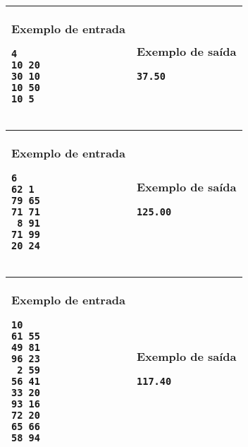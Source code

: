 \newpage
\begin{table}[!h]
\centering
\begin{tabular}{|l|l|}
\hline
\begin{minipage}[t]{3in}
\textbf{Exemplo de entrada}
\begin{verbatim}
4
10 20
30 10
10 50
10 5
\end{verbatim}
\vspace{1mm}
\end{minipage}
&
\begin{minipage}[t]{3in}
\textbf{Exemplo de saída}
\begin{verbatim}
37.50
\end{verbatim}
\vspace{1mm}
\end{minipage} \\
\hline
\end{tabular}
\end{table}

\begin{table}[!h]
\centering
\begin{tabular}{|l|l|}
\hline
\begin{minipage}[t]{3in}
\textbf{Exemplo de entrada}
\begin{verbatim}
6
62 1
79 65
71 71
 8 91
71 99
20 24
\end{verbatim}
\vspace{1mm}
\end{minipage}
&
\begin{minipage}[t]{3in}
\textbf{Exemplo de saída}
\begin{verbatim}
125.00
\end{verbatim}
\vspace{1mm}
\end{minipage} \\
\hline
\end{tabular}
\end{table}

\begin{table}[!h]
\centering
\begin{tabular}{|l|l|}
\hline
\begin{minipage}[t]{3in}
\textbf{Exemplo de entrada}
\begin{verbatim}
10
61 55
49 81
96 23
 2 59
56 41
33 20
93 16
72 20
65 66
58 94
\end{verbatim}
\vspace{1mm}
\end{minipage}
&
\begin{minipage}[t]{3in}
\textbf{Exemplo de saída}
\begin{verbatim}
117.40
\end{verbatim}
\vspace{1mm}
\end{minipage} \\
\hline
\end{tabular}
\end{table}